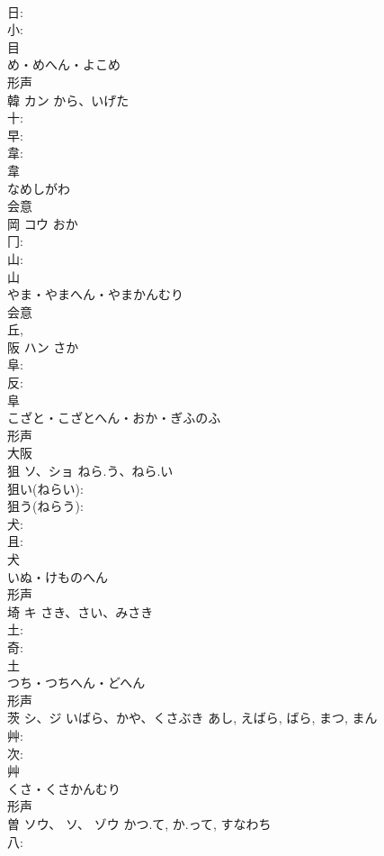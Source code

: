\documentclass[8pt]{extreport}
\begin{document}
\begin{CJK}{UTF8}{min}
\\	日: 
\\	小: 
\\	目	
\\	め・めへん・よこめ	
\\	形声 
\\	韓	カン	から、いげた		
\\	十: 
\\	早: 
\\	韋: 
\\	韋	
\\	なめしがわ	
\\	会意 
\\	岡	コウ	おか		
\\	冂: 
\\	山: 
\\	山	
\\	やま・やまへん・やまかんむり	
\\	会意 
\\	丘, 
\\	阪	ハン	さか		
\\	阜: 
\\	反: 
\\	阜	
\\	こざと・こざとへん・おか・ぎふのふ	
\\	形声 
\\	大阪 
\\	狙	ソ、ショ	ねら.う、ねら.い		
\\	狙い(ねらい): 
\\	狙う(ねらう): 
\\	犬: 
\\	且: 
\\	犬	
\\	いぬ・けものへん	
\\	形声 
\\	埼	キ	さき、さい、みさき		
\\	土: 
\\	奇: 
\\	土	
\\	つち・つちへん・どへん	
\\	形声 
\\	茨	シ、ジ	いばら、かや、くさぶき	あし, えばら, ばら, まつ, まん	
\\	艸: 
\\	次: 
\\	艸	
\\	くさ・くさかんむり	
\\	形声 
\\	曽	ソウ、 ソ、 ゾウ	かつ.て, か.って, すなわち		
\\	八: 

\end{CJK}
\end{document}
